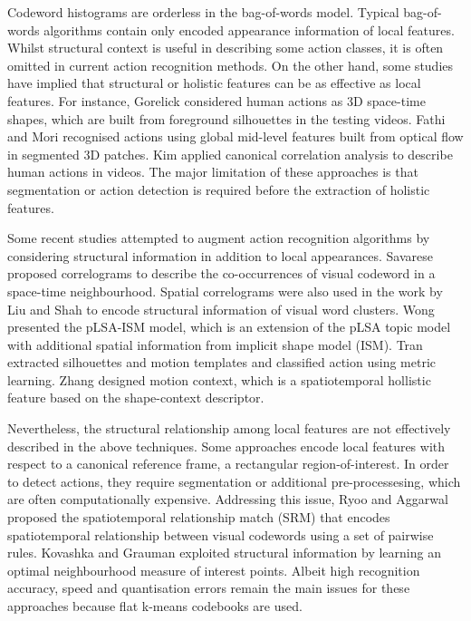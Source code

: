 Codeword histograms are orderless in the bag-of-words model. 
Typical bag-of-words algorithms contain only encoded appearance information of local features.  
Whilst structural context is useful in describing some action classes, it is often omitted in current action recognition methods.
On the other hand, some studies have implied that structural or holistic features can be as effective as local features. 
For instance, Gorelick \etal \cite{Gorelick2007} considered human actions as 3D space-time shapes, which are built from foreground silhouettes in the testing videos. Fathi and Mori \cite{Fathi2008} recognised actions using global mid-level features built from optical flow in segmented 3D patches. Kim \etal \cite{Kim2007} applied canonical correlation analysis to describe human actions in videos. The major limitation of these approaches is that segmentation or action detection is required before the extraction of holistic features.  

Some recent studies attempted to augment action recognition algorithms by considering structural information in addition to local appearances. 
Savarese \etal \cite{Savarese2008} proposed correlograms to describe the co-occurrences of visual codeword in a space-time neighbourhood. Spatial correlograms were also used in the work by Liu and Shah \cite{Liu2008} to encode structural information of visual word clusters.  
Wong \etal \cite{Wong2007} presented the pLSA-ISM model, which is an extension of the pLSA topic model \cite{Fergus2005} with additional spatial information from implicit shape model (ISM). 
Tran \etal \cite{Tran2008} extracted silhouettes and motion templates and classified action using metric learning.  
Zhang \etal \cite{Zhang2008} designed motion context, which is a spatiotemporal hollistic feature based on the shape-context descriptor.  

Nevertheless, the structural relationship among local features are not effectively described in the above techniques. 
Some approaches \cite{Wong2007,Tran2008, Zhang2008} encode local features with respect to a canonical reference frame, \eg a rectangular region-of-interest. In order to detect actions, they require segmentation or additional pre-processesing, which are often computationally expensive.
Addressing this issue, Ryoo and Aggarwal \cite{Ryoo2009} proposed the spatiotemporal relationship match (SRM) that encodes spatiotemporal relationship between visual codewords using a set of pairwise rules. Kovashka and Grauman \cite{Kovashka2010} exploited structural information by learning an optimal neighbourhood measure of interest points. 
Albeit high recognition accuracy, speed and quantisation errors remain the main issues for these approaches because flat k-means codebooks are used.   


